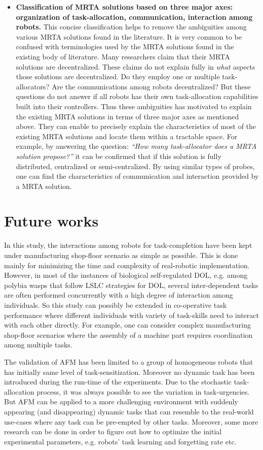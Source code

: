 \begin{itemize}
\item \textbf{Classification of MRTA solutions based on three major axes: organization of task-allocation, communication, interaction among robots.} This concise classification helps to remove the ambiguities among various MRTA solutions found in the literature.  It is very common to be confused with terminologies used by the MRTA solutions found in the existing body of literature. Many researchers claim that their MRTA solutions are decentralized. These claims do not explain fully in \textit{what} aspects those solutions are decentralized. Do they employ one or multiple task-allocators? Are the communications among robots decentralized? But these questions do not answer if all robots has their own task-allocation capabilities built into their controllers. Thus these ambiguities has motivated to explain the existing MRTA solutions in terms of three major axes as mentioned above. They can enable to precisely  explain the characteristics of most of the existing MRTA solutions and locate them within a tractable space. For example, by answering the question: \textit{``How many task-allocator does a MRTA solution propose?''} it can be confirmed that if this solution is fully distributed, centralized or semi-centralized. By using similar types of probes, one can find the characteristics of communication and interaction provided by a MRTA solution.
\end{itemize}
\section{Future works}
In this study, the interactions among robots for task-completion  have been kept under manufacturing shop-floor scenario as simple as possible. This is done mainly for minimizing the time and complexity of real-robotic implementation. However, in most of the instances of biological self-regulated DOL, e.g. among polybia wasps that follow LSLC strategies for DOL, several inter-dependent tasks are often performed concurrently with a high degree of interaction among individuals. So this study can possibly be extended in co-operative task performance where different individuals with variety of task-skills need to interact with each other directly. For example,  one can consider complex manufacturing shop-floor scenarios where the assembly of a machine part requires coordination among multiple tasks. 

The validation of AFM has been limited to a group of homogeneous robots that has initially same level of task-sensitization. Moreover no dynamic task has been introduced during the run-time of the experiments. Due to the stochastic task-allocation process, it was always possible to see the  variation in task-urgencies. But AFM can be applied to a more challenging environment with suddenly appearing (and disappearing) dynamic tasks that can resemble to the real-world use-cases where any task can be pre-empted by other tasks. Moreover, some more research can be done in order to figure out how to optimize the initial experimental parameters, e.g. robots' task learning and forgetting rate etc. 

